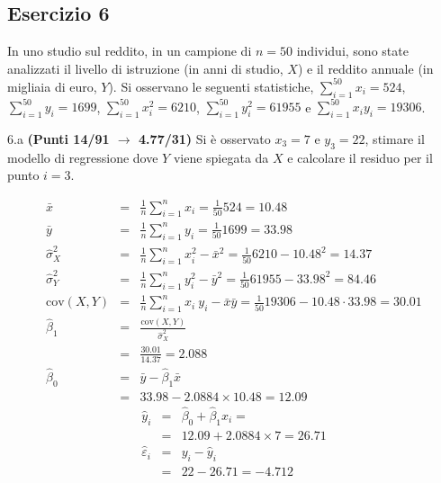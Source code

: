 \documentclass[
  11pt,
]{book}
\theoremstyle{mytheoremstyle}
\theoremstyle{mydefstyle}
\newenvironment{sol}
  {
  \begin{tcolorbox}[enhanced,breakable,arc=0.1mm,boxrule=1pt,colback=white,colframe=iblue,
  title=\bf \fontfamily{lmss}\selectfont \hspace{.5 cm} Soluzione,drop fuzzy shadow]

}{
\end{tcolorbox}
  }
\begin{document}
\subsection{Esercizio 6}\label{esercizio-6-30}

In uno studio sul reddito, in un campione di \(n=50\) individui, sono state analizzati il livello di istruzione (in anni di studio, \(X\)) e il reddito annuale (in migliaia di euro, \(Y\)).
Si osservano le seguenti statistiche, \(\sum_{i=1}^{50}x_i=524\), \(\sum_{i=1}^{50}y_i=1699\),
\(\sum_{i=1}^{50}x_i^2=6210\), \(\sum_{i=1}^{50}y_i^2=61955\) e \(\sum_{i=1}^{50}x_iy_i=19306\).

6.a \textbf{(Punti 14/91 \(\rightarrow\) 4.77/31)} Si è osservato \(x_3=7\) e \(y_3=22\), stimare il modello di regressione dove \(Y\) viene spiegata da \(X\) e calcolare il residuo per il punto \(i=3\).

\begin{sol}
\begin{eqnarray*}
           \bar x &=&\frac 1 n\sum_{i=1}^n x_i = \frac {1}{ 50 }  524 =  10.48 \\
           \bar y &=&\frac 1 n\sum_{i=1}^n y_i = \frac {1}{ 50 }  1699 =  33.98 \\
           \hat\sigma_X^2&=&\frac 1 n\sum_{i=1}^n x_i^2-\bar x^2=\frac {1}{ 50 }  6210  - 10.48 ^2= 14.37 \\
           \hat\sigma_Y^2&=&\frac 1 n\sum_{i=1}^n y_i^2-\bar y^2=\frac {1}{ 50 }  61955  - 33.98 ^2= 84.46 \\
           \text{cov}(X,Y)&=&\frac 1 n\sum_{i=1}^n x_i~y_i-\bar x\bar y=\frac {1}{ 50 }  19306 - 10.48 \cdot 33.98 = 30.01 \\
           \hat\beta_1 &=& \frac{\text{cov}(X,Y)}{\hat\sigma_X^2} \\
                    &=& \frac{ 30.01 }{ 14.37 }  =  2.088 \\
           \hat\beta_0 &=& \bar y - \hat\beta_1 \bar x\\
                    &=&  33.98 - 2.0884 \times  10.48 = 12.09 
         \end{eqnarray*}\begin{eqnarray*}
\hat y_i &=&\hat\beta_0+\hat\beta_1 x_i=\\ 
&=& 12.09 + 2.0884 \times 7 = 26.71 \\ 
\hat \varepsilon_i &=& y_i-\hat y_i\\ 
&=& 22 - 26.71 = -4.712  
\end{eqnarray*}

\end{sol}
\end{document}
